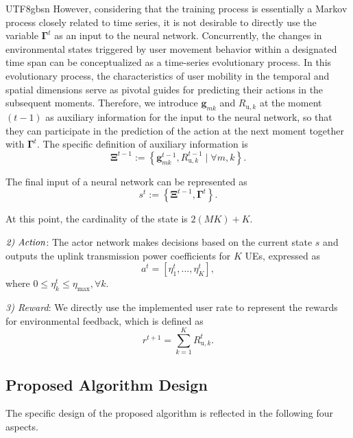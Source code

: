 \documentclass[lettersize,journal]{IEEEtran}
\begin{document}
\begin{CJK}{UTF8}{gbsn}
However, considering that the training process is essentially a Markov process closely related to time series, it is not desirable to directly use the variable $\mathbf{\Gamma}^t$ as an input to the neural network. Concurrently, the changes in environmental states triggered by user movement behavior within a designated time span can be conceptualized as a time-series evolutionary process. In this evolutionary process, the characteristics of user mobility in the temporal and spatial dimensions serve as pivotal guides for predicting their actions in the subsequent moments. 
Therefore, we introduce $\mathbf{g}_{mk}$ and $R_{\text{u},k}$ at the moment $(t-1)$ as auxiliary information for the input to the neural network, so that they can participate in the prediction of the action at the next moment together with $\mathbf{\Gamma}^t$. The specific definition of auxiliary information is 
\begin{equation}\mathbf{\Xi} ^{t-1}:=\left \{\mathbf{g}_{mk}^{t-1} , R_{\text{u},k}^{t-1} \mid \forall m,k \right \}  .\end{equation} 

The final input of a neural network can be represented as
\begin{equation}s^{t}:=\left \{ \mathbf{\Xi} ^{t-1}, \mathbf{\Gamma} ^t\right \}. \end{equation}

At this point, the cardinality of the state is $2 \left ( MK \right ) +K$.


$\emph{2) Action}$:
The actor network makes decisions based on the current state $s$ and outputs the uplink transmission power coefficients for $K$ UEs, expressed as
\begin{equation}a ^{t}=\left [ \eta _1^{t},...,\eta _K^{t} \right ] ,\end{equation}
where $0\le \eta _k^{t}\le \eta _\text{max}, \forall k$.

\emph{3) Reward}: We directly use the implemented user rate to represent the rewards for environmental feedback, which is defined as
\begin{equation}r^{t+1} = \textstyle \sum_{k=1}^{K} R_{\text{u},k}^{t}.\end{equation}

\subsection{Proposed Algorithm Design}
The specific design of the proposed algorithm is reflected in the following four aspects.


\end{CJK}
\end{document}
